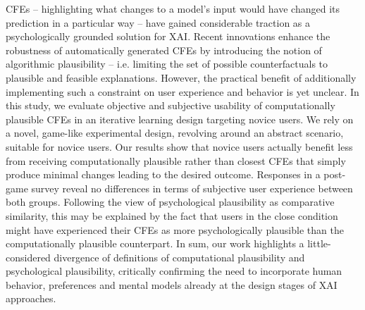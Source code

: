 \Glspl{CFE} -- highlighting what changes to a model's input would have changed its prediction in a particular way -- have gained considerable traction as a psychologically grounded solution for \gls{XAI}. 
Recent innovations enhance the robustness of automatically generated \glspl{CFE} by introducing the notion of algorithmic plausibility -- i.e. limiting the set of possible counterfactuals to plausible and feasible explanations. %
However, the practical benefit of additionally implementing such a constraint on user experience and behavior is yet unclear.
In this study, we evaluate objective and subjective usability of computationally plausible \glspl{CFE} in an iterative learning design targeting novice users.
We rely on a novel, game-like experimental design, revolving around an abstract scenario, suitable for novice users.
Our results show that novice users actually benefit less from receiving computationally plausible rather than closest \glspl{CFE} that simply produce minimal changes leading to the desired outcome.
Responses in a post-game survey reveal no differences in terms of subjective user experience between both groups.
Following the view of psychological plausibility as comparative similarity, this may be explained by the fact that users in the close condition might have experienced their \glspl{CFE} as more psychologically plausible than the computationally plausible counterpart.
In sum, our work highlights a little-considered divergence of definitions of computational plausibility and psychological plausibility, critically confirming the need to incorporate human behavior, preferences and mental models already at the design stages of \gls{XAI} approaches.